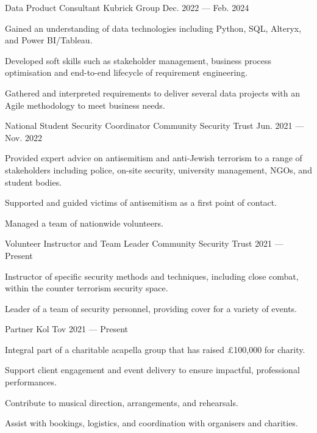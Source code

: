 \begin{cventries}
  \cventry
  {Data Product Consultant}
  {Kubrick Group}
  {}
  {Dec. 2022 --- Feb. 2024}
  {
    \begin{cvitems}
      \item {Gained an understanding of data technologies including Python, SQL, Alteryx, and Power BI/Tableau.}
      \item {Developed soft skills such as stakeholder management, business process optimisation and end-to-end lifecycle of requirement engineering.}
      \item {Gathered and interpreted requirements to deliver several data projects with an Agile methodology to meet business needs.}
    \end{cvitems}
  }

  \cventry
  {National Student Security Coordinator}
  {Community Security Trust}
  {}
  {Jun. 2021 --- Nov. 2022}
  {
    \begin{cvitems}
      \item {Provided expert advice on antisemitism and anti-Jewish terrorism to a range of stakeholders including police, on-site security, university management, NGOs, and student bodies.}
      \item {Supported and guided victims of antisemitism as a first point of contact.}
      \item {Managed a team of nationwide volunteers.}
    \end{cvitems}
  }
\end{cventries}

\begin{cventries}
  \cventry
  {Volunteer Instructor and Team Leader}
  {Community Security Trust}
  {}
  {2021 --- Present}
  {
    \begin{cvitems}
      \item {Instructor of specific security methods and techniques, including close combat, within the counter terrorism security space.}
      \item {Leader of a team of security personnel, providing cover for a variety of events.}
    \end{cvitems}
  }

  \cventry
  {Partner}
  {Kol Tov}
  {}
  {2021 --- Present}
  {
    \begin{cvitems}
      \item {Integral part of a charitable acapella group that has raised £100,000 for charity.}
      \item {Support client engagement and event delivery to ensure impactful, professional performances.}
      \item {Contribute to musical direction, arrangements, and rehearsals.}
      \item {Assist with bookings, logistics, and coordination with organisers and charities.}
    \end{cvitems}
  }
\end{cventries}
